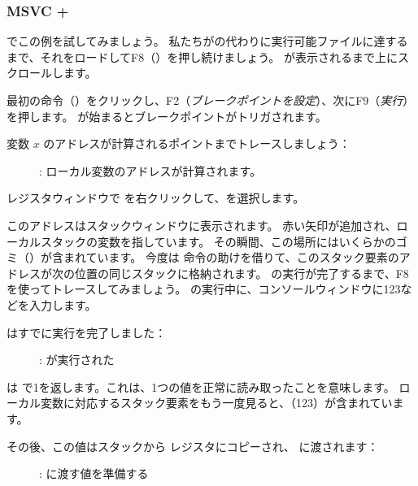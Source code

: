 \clearpage
\subsubsection{MSVC + \olly}
\myindex{\olly}

\olly でこの例を試してみましょう。 
私たちがの代わりに実行可能ファイルに達するまで、それをロードしてF8（\stepover）を押し続けましょう。
\main が表示されるまで上にスクロールします。

最初の命令（）をクリックし、F2（\emph{ブレークポイントを設定}）、次にF9（\emph{実行}）を押します。 
\main が始まるとブレークポイントがトリガされます。

変数 $x$ のアドレスが計算されるポイントまでトレースしましょう：

\begin{figure}[H]
\centering
{}
\caption{\olly: ローカル変数のアドレスが計算されます。}
\label{fig:scanf_ex1_olly_1}
\end{figure}

レジスタウィンドウで \EAX を右クリックして、を選択します。

このアドレスはスタックウィンドウに表示されます。 
赤い矢印が追加され、ローカルスタックの変数を指しています。 
その瞬間、この場所にはいくらかのゴミ（）が含まれています。 
今度は \PUSH 命令の助けを借りて、このスタック要素のアドレスが次の位置の同じスタックに格納されます。 
\scanf の実行が完了するまで、F8を使ってトレースしてみましょう。 
\scanf の実行中に、コンソールウィンドウに123などを入力します。



\clearpage
\scanf はすでに実行を完了しました：

\begin{figure}[H]
\centering
{}
\caption{\olly: \scanf が実行された}
\label{fig:scanf_ex1_olly_3}
\end{figure}

\scanf は \EAX で1を返します。これは、1つの値を正常に読み取ったことを意味します。 
ローカル変数に対応するスタック要素をもう一度見ると、（123）が含まれています。

\clearpage

その後、この値はスタックから \ECX レジスタにコピーされ、 \printf に渡されます：

\begin{figure}[H]
\centering
{}
\caption{\olly: \printf に渡す値を準備する}
\label{fig:scanf_ex1_olly_4}
\end{figure}
